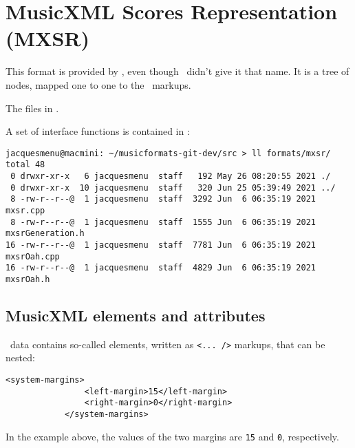 



\chapter{MusicXML Scores Representation (MXSR)}

This format is provided by \libmusicxml, even though \fober\ didn't give it that name. It is a tree of  nodes, mapped one to one to the \mxml\ markups.

The files in .

A set of interface functions is contained in :
\begin{lstlisting}[language=Terminal]
jacquesmenu@macmini: ~/musicformats-git-dev/src > ll formats/mxsr/
total 48
 0 drwxr-xr-x   6 jacquesmenu  staff   192 May 26 08:20:55 2021 ./
 0 drwxr-xr-x  10 jacquesmenu  staff   320 Jun 25 05:39:49 2021 ../
 8 -rw-r--r--@  1 jacquesmenu  staff  3292 Jun  6 06:35:19 2021 mxsr.cpp
 8 -rw-r--r--@  1 jacquesmenu  staff  1555 Jun  6 06:35:19 2021 mxsrGeneration.h
16 -rw-r--r--@  1 jacquesmenu  staff  7781 Jun  6 06:35:19 2021 mxsrOah.cpp
16 -rw-r--r--@  1 jacquesmenu  staff  4829 Jun  6 06:35:19 2021 mxsrOah.h
\end{lstlisting}


\section{MusicXML elements and attributes}

\mxml\ data contains so-called elements, written as {\tt <...~/>} markups, that can be nested:
\begin{lstlisting}[language=MusicXML]
			<system-margins>
				<left-margin>15</left-margin>
				<right-margin>0</right-margin>
			</system-margins>
\end{lstlisting}
In the example above, the values of the two margins are {\tt 15} and {\tt 0}, respectively.

